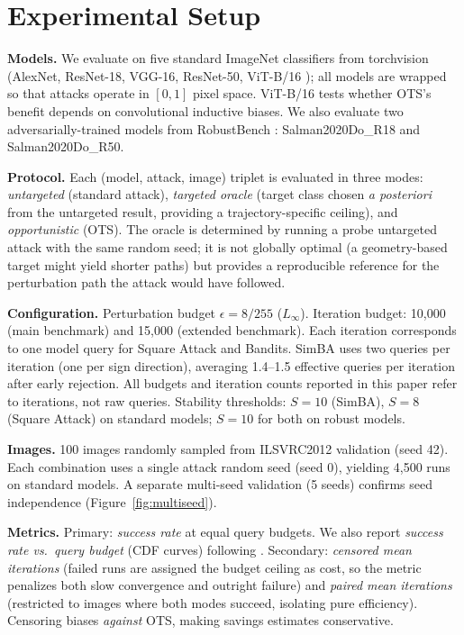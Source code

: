 \documentclass{cap2026}
\begin{document}
\section{Experimental Setup}\label{sec:setup}

\hspace{\parindent}\textbf{Models.} We evaluate on five standard ImageNet classifiers from torchvision (AlexNet, ResNet-18, VGG-16, ResNet-50, ViT-B/16 \citep{dosovitskiy2021image}); all models are wrapped so that attacks operate in $[0, 1]$ pixel space. ViT-B/16 tests whether OTS's benefit depends on convolutional inductive biases. We also evaluate two adversarially-trained models from RobustBench \citep{salman2020adversarially,croce2021robustbench}: Salman2020Do\_R18 and Salman2020Do\_R50.

\textbf{Protocol.} Each (model, attack, image) triplet is evaluated in three modes: \textit{untargeted} (standard attack), \textit{targeted oracle} (target class chosen \textit{a posteriori} from the untargeted result, providing a trajectory-specific ceiling), and \textit{opportunistic} (OTS). The oracle is determined by running a probe untargeted attack with the same random seed; it is not globally optimal (a geometry-based target might yield shorter paths) but provides a reproducible reference for the perturbation path the attack would have followed.

\textbf{Configuration.} Perturbation budget $\epsilon = 8/255$ ($L_\infty$). Iteration budget: 10,000 (main benchmark) and 15,000 (extended benchmark). Each iteration corresponds to one model query for Square Attack and Bandits. SimBA uses two queries per iteration (one per sign direction), averaging 1.4--1.5 effective queries per iteration after early rejection. All budgets and iteration counts reported in this paper refer to iterations, not raw queries. Stability thresholds: $S = 10$ (SimBA), $S = 8$ (Square Attack) on standard models; $S = 10$ for both on robust models.

\textbf{Images.} 100 images randomly sampled from ILSVRC2012 validation (seed 42). Each combination uses a single attack random seed (seed 0), yielding 4,500 runs on standard models. A separate multi-seed validation (5 seeds) confirms seed independence (Figure~\ref{fig:multiseed}).

\textbf{Metrics.} Primary: \textit{success rate} at equal query budgets. We also report \textit{success rate vs.\ query budget} (CDF curves) following \citet{ughi2021empirical}. Secondary: \textit{censored mean iterations} (failed runs are assigned the budget ceiling as cost, so the metric penalizes both slow convergence and outright failure) and \textit{paired mean iterations} (restricted to images where both modes succeed, isolating pure efficiency). Censoring biases \emph{against} OTS, making savings estimates conservative.
\end{document}
